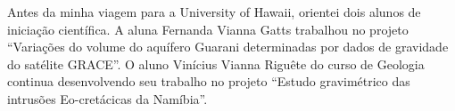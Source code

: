 Antes da minha viagem para a University of Hawaii, orientei dois alunos de
iniciação científica.
A aluna Fernanda Vianna Gatts trabalhou no projeto ``Variações do volume do
aquífero Guarani determinadas por dados de gravidade do satélite GRACE''.
O aluno Vinícius Vianna Riguête do curso de Geologia continua desenvolvendo seu
trabalho no projeto ``Estudo gravimétrico das intrusões
Eo-cretácicas da Namíbia''.
